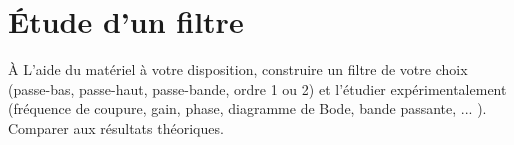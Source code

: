 \documentclass{tp}
\begin{document}


\section{Étude d'un filtre}
\`A L'aide du matériel à votre disposition, construire un filtre de votre choix (passe-bas, passe-haut, passe-bande, ordre 1 ou 2) et l'étudier expérimentalement (fréquence de coupure, gain, phase, diagramme de Bode, bande passante, ... ). Comparer aux résultats théoriques.
\end{document}
